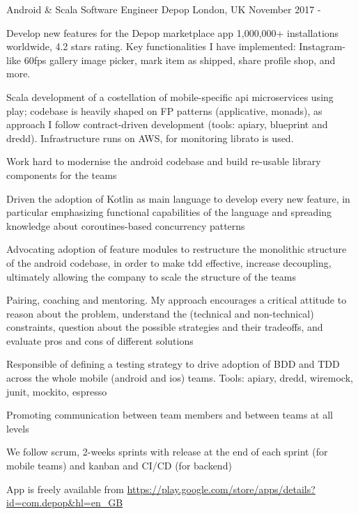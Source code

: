 \begin{cventries}
\cventry
	{Android \& Scala Software Engineer}
{Depop}
	{London, UK}
	{November 2017 - \present{}}
{%
\begin{cvitems} 
\item 
	Develop new features for the Depop marketplace app
	1,000,000+ installations worldwide, 4.2 stars rating. 
	 Key functionalities I have implemented: Instagram-like 60fps gallery image picker, mark item as shipped, share profile shop, and more. 
\item Scala development of a costellation of mobile-specific api microservices using play; codebase is heavily shaped on FP patterns (applicative, monads), as approach I follow contract-driven development (tools: apiary, blueprint and dredd). Infrastructure runs on AWS, for monitoring librato is used. 
\item Work hard to modernise the android codebase and build re-usable library components for the teams 
\item Driven the adoption of Kotlin as main language to develop every new feature, in particular emphasizing functional capabilities of the language and spreading knowledge about coroutines-based concurrency patterns 
\item Advocating adoption of feature modules to restructure the monolithic structure of the android codebase, in order to make tdd effective, increase decoupling, ultimately allowing the company to scale the structure of the teams 
\item Pairing, coaching and mentoring. My approach encourages a critical attitude to reason about the problem, understand the (technical and non-technical) constraints,  question about the possible strategies and their tradeoffs, and evaluate pros and cons of different solutions
 \item Responsible of defining a testing strategy to drive adoption of BDD and TDD across the whole mobile (android and ios) teams. Tools: apiary, dredd, wiremock, junit, mockito, espresso
\item Promoting communication between team members and between teams at all levels
\item We follow scrum, 2-weeks sprints with release at the end of each sprint (for mobile teams) and kanban and CI/CD (for backend)
\item App is freely available from 
	\url{https://play.google.com/store/apps/details?id=com.depop&hl=en_GB} 
	\end{cvitems}
}


\end{cventries}
